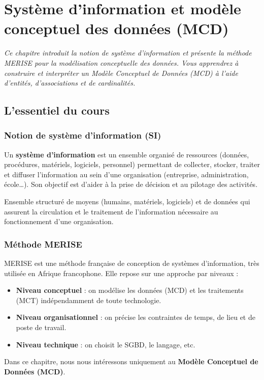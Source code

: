 \chapter{Système d'information et modèle conceptuel des données (MCD)}

\textit{Ce chapitre introduit la notion de système d'information et présente la méthode MERISE pour la modélisation conceptuelle des données. Vous apprendrez à construire et interpréter un Modèle Conceptuel de Données (MCD) à l'aide d'entités, d'associations et de cardinalités.}

\section{L'essentiel du cours}

\subsection*{Notion de système d'information (SI)}
Un \textbf{système d'information} est un ensemble organisé de ressources (données, procédures, matériels, logiciels, personnel) permettant de collecter, stocker, traiter et diffuser l'information au sein d'une organisation (entreprise, administration, école…). Son objectif est d'aider à la prise de décision et au pilotage des activités.

\begin{definition}
Ensemble structuré de moyens (humains, matériels, logiciels) et de données qui assurent la circulation et le traitement de l'information nécessaire au fonctionnement d'une organisation.
\end{definition}

\subsection*{Méthode MERISE}
MERISE est une méthode française de conception de systèmes d'information, très utilisée en Afrique francophone. Elle repose sur une approche par niveaux :
\begin{itemize}
    \item \textbf{Niveau conceptuel} : on modélise les données (MCD) et les traitements (MCT) indépendamment de toute technologie.
    \item \textbf{Niveau organisationnel} : on précise les contraintes de temps, de lieu et de poste de travail.
    \item \textbf{Niveau technique} : on choisit le SGBD, le langage, etc.
\end{itemize}
Dans ce chapitre, nous nous intéressons uniquement au \textbf{Modèle Conceptuel de Données (MCD)}.

